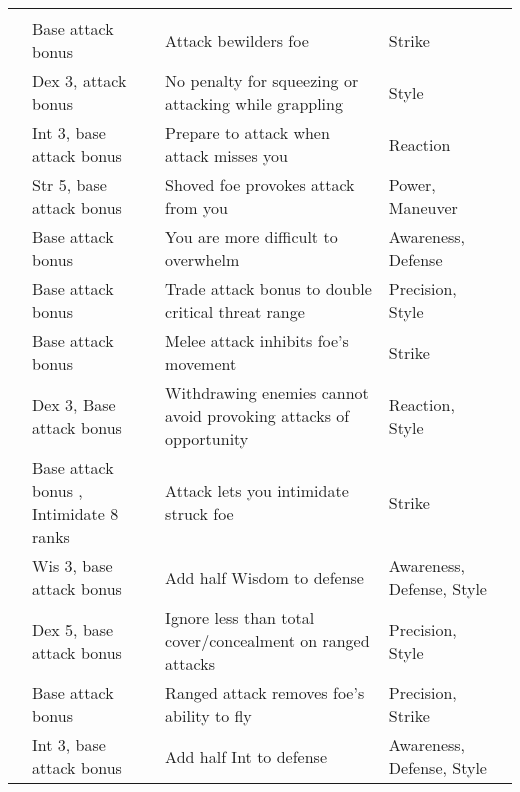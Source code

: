{\begin{longtabu}{>{\lcol}p{10em} >{\lcol}p{15em} >{\lcol}X >{\lcol}p{6em} >{\lcol}p{3em}}
        \midrule
         &  &  &  &  \\
         & Base attack bonus  & Attack bewilders foe & Strike &  \\
         & Dex 3, attack bonus  & No penalty for squeezing or attacking while grappling & Style &  \\
         & Int 3, base attack bonus  & Prepare to attack when attack misses you & Reaction &  \\
         & Str 5, base attack bonus  & Shoved foe provokes attack from you & Power, Maneuver &  \\
         & Base attack bonus  & You are more difficult to overwhelm & Awareness, Defense &  \\
         & Base attack bonus  & Trade attack bonus to double critical threat range & Precision, Style &  \\
         & Base attack bonus  & Melee attack inhibits foe's movement & Strike &  \\
         & Dex 3, Base attack bonus  & Withdrawing enemies cannot avoid provoking attacks of opportunity & Reaction, Style &  \\
         & Base attack bonus , Intimidate 8 ranks & Attack lets you intimidate struck foe & Strike &  \\
         & Wis 3, base attack bonus  & Add half Wisdom to defense & Awareness, Defense, Style &  \\
         & Dex 5, base attack bonus  & Ignore less than total cover/concealment on ranged attacks & Precision, Style &  \\
         & Base attack bonus  & Ranged attack removes foe's ability to fly & Precision, Strike &  \\
         & Int 3, base attack bonus  & Add half Int to defense & Awareness, Defense, Style &  \\

\end{longtabu}}
